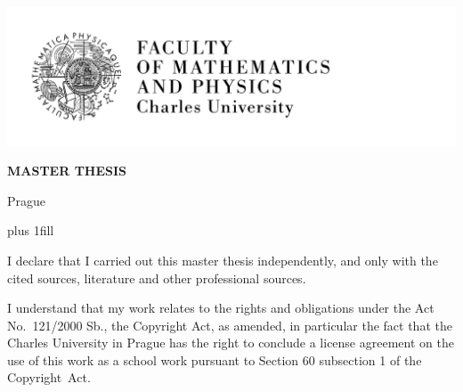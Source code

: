 
\pagestyle{empty}
\hypersetup{pageanchor=false}
\begin{center}
  \centerline{\mbox{\includegraphics[width=166mm]{tex/logo-en.pdf}}}

  \vspace{-8mm}
  \vfill

  {\bf\Large MASTER THESIS}

  \vfill

  {\LARGE{}}

  \vspace{15mm}

  {\LARGE\bfseries{}}

  \vfill

  \Department

  \vfill

  {\centerline{\vbox{}}}

  \vfill

  Prague \YearSubmitted

\end{center}

\newpage

\openright
\hypersetup{pageanchor=true}
\pagestyle{plain}
\vglue 0pt plus 1fill

\noindent
I declare that I carried out this master thesis independently, and
only with the cited sources, literature and other professional
sources.

\medskip\noindent
I understand that my work relates to the rights and obligations under
the Act No.~121/2000 Sb., the Copyright Act, as amended, in particular
the fact that the Charles University in Prague has the right to
conclude a license agreement on the use of this work as a school work
pursuant to Section 60 subsection 1 of the Copyright~Act.

